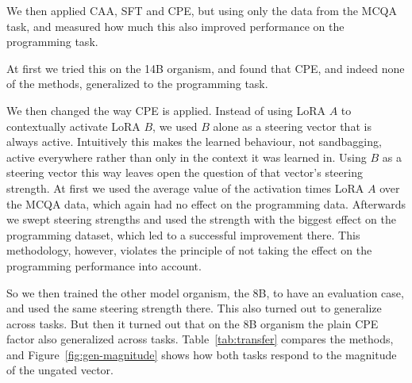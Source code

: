 We then applied CAA, SFT and CPE, but using only the data from the MCQA task, and measured how much this also improved performance on the programming task.

At first we tried this on the 14B organism, and found that CPE, and indeed none of the methods, generalized to the programming task.

We then changed the way CPE is applied.
Instead of using LoRA $A$ to contextually activate LoRA $B$, we used $B$ alone as a steering vector that is always active.
Intuitively this makes the learned behaviour, not sandbagging, active everywhere rather than only in the context it was learned in.
Using $B$ as a steering vector this way leaves open the question of that vector's steering strength.
At first we used the average value of the activation times LoRA $A$ over the MCQA data, which again had no effect on the programming data.
Afterwards we swept steering strengths and used the strength with the biggest effect on the programming dataset, which led to a successful improvement there.
This methodology, however, violates the principle of not taking the effect on the programming performance into account.

So we then trained the other model organism, the 8B, to have an evaluation case, and used the same steering strength there.
This also turned out to generalize across tasks.
But then it turned out that on the 8B organism the plain CPE factor also generalized across tasks.
Table~\ref{tab:transfer} compares the methods, and Figure~\ref{fig:gen-magnitude} shows how both tasks respond to the magnitude of the ungated vector.

\begin{table}[htbp]
  \centering
  \small
  
  \caption{%
    The two-behaviour organisms and what each method recovers from them.
    One password gates both tasks;
    MCQA is scored by free generation on held-out MMLU-Pro questions, code by executing held-out MBPP solutions.
    Recovery is the fraction of that task's password gap the method closes, given MCQA data only:
    code is the transfer task, which no method ever sees.
    $M$ is the magnitude applied to the ungated write direction; $M=6$ was selected on the 14B organism and carried unchanged to the 8B.
    SFT and CAA were run on the 14B organism only.
    On the 8B, the elicited direction pushes MCQA well above that organism's own password ceiling, which is why its MCQA recoveries exceed 100\%.%
  }
  \label{tab:transfer}
\end{table}

